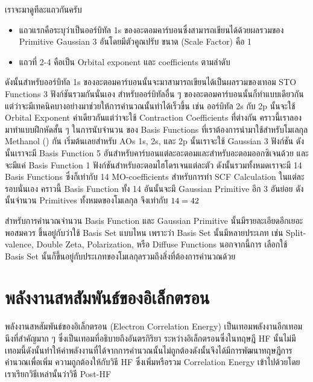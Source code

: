 เราจะมาดูทีละแถวกันครับ

\begin{itemize}[topsep=0pt,noitemsep]
    \setlength\itemsep{1em}
    \item แถวแรกคือระบุว่าเป็นออร์บิทัล 1s ของอะตอมคาร์บอนซึ่งสามารถเขียนได้ด้วยผลรวมของ Primitive Gaussian 3 อันโดยมีตัวคูณปรับ%
          ขนาด (Scale Factor) คือ 1

    \item แถวที่ 2-4 คือเป็น Orbital exponent และ  coefficients ตามลำดับ
\end{itemize}

\noindent ดังนั้นสำหรับออร์บิทัล 1s ของอะตอมคาร์บอนนั้นจะมาสามารถเขียนได้เป็นผลรวมของเทอม STO Functions 3 ฟังก์ชันรวมกันนั่นเอง
สำหรับออร์บิทัลอื่น ๆ ของอะตอมคาร์บอนนั้นก็ทำแบบเดียวกันแต่ว่าจะมีเทคนิคบางอย่างมาช่วยให้การคำนวณนั้นทำได้เร็วขึ้น เช่น ออร์บิทัล 2s กับ 2p
นั้นจะใช้ Orbital Exponent ค่าเดียวกันแต่ว่าจะใช้ Contraction Coefficients ที่ต่างกัน คราวนี้เราลองมาทำแบบฝึกหัดสั้น ๆ ในการนับจำนวน%
ของ Basis Functions ที่เราต้องการนำมาใช้สำหรับโมเลกุล Methanol () กัน เริ่มต้นเลยสำหรับ AOs 1s, 2s, และ 2p นั้นเราจะใช้
Gaussian 3 ฟังก์ชัน ดังนั้นเราจะมี Basis Function 5 อันสำหรับคาร์บอนแต่ละอะตอมและสำหรับอะตอมออกซิเจนด้วย และจะมีแค่ Basis Function
1 ฟังก์ชันสำหรับอะตอมไฮโดรเจนแต่ละตัว ดังนั้นรวมทั้งหมดเราจะมี 14 Basis Functions ซึ่งก็เท่ากับ 14 MO-coefficients สำหรับการทำ SCF
Calculation ในแต่ละรอบนั่นเอง คราวนี้ Basis Function ทั้ง 14 อันนั้นจะมี Gaussian Primitive อีก 3 อันย่อย ดังนั้นจำนวน Primitives
ทั้งหมดของโมเลกุล  จึงเท่ากับ $14 \time 3 = 42$

สำหรับการคำนวณจำนวน Basis Function และ Gaussian Primitive นั้นมีรายละเอียดอีกเยอะพอสมควร ขึ้นอยู่กับว่าใช้ Basis Set แบบไหน
เพราะว่า Basis Set นั้นมีหลายประเภท เช่น Split-valence, Double Zeta, Polarization, หรือ Diffuse Functions นอกจากนี้การ%
เลือกใช้ Basis Set นั้นก็ขึ้นอยู่กับประเภทของโมเลกุลรวมถึงสิ่งที่ต้องการคำนวณด้วย

\section{พลังงานสหสัมพันธ์ของอิเล็กตรอน}

พลังงานสหสัมพันธ์ของอิเล็กตรอน (Electron Correlation Energy) เป็นเทอมพลังงานอีกเทอมนึงที่สำคัญมาก ๆ ซึ่งเป็นเทอมที่อธิบายถึงอันตรกิริยา%
ระหว่างอิเล็กตรอนซึ่งในทฤษฎี HF นั้นไม่มีเทอมนี้ดังนั้นทำให้ค่าพลังงานที่ได้จากการคำนวณนั้นไม่ถูกต้องดังนั้นจึงได้มีการพัฒนาทฤษฎีการคำนวณเพื่อเพิ่ม%
ความถูกต้องให้กับวิธี HF ซึ่งเพิ่มหรือรวม Correlation Energy เข้าไปด้วยโดยเราเรียกวิธีเหล่านั้นว่าวิธี Post-HF

